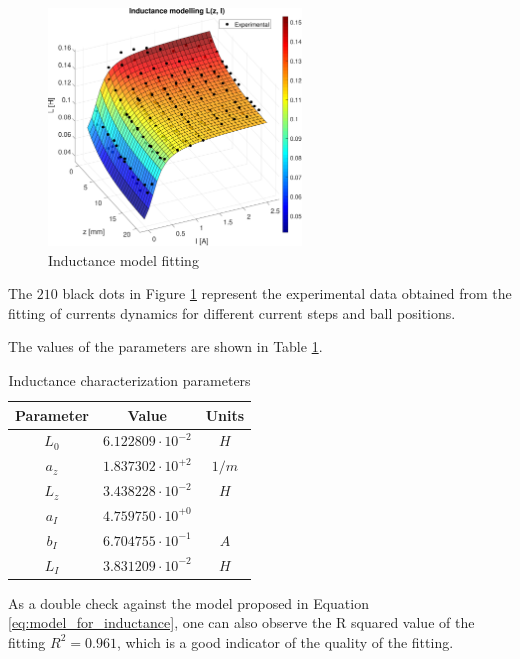\begin{figure}[H]
    \centering
    \includegraphics[width=0.6\textwidth]{img/MATLAB/identification/inductance.pdf}
    \caption{Inductance model fitting}
    \label{fig:inductance_characterization_inductance}
\end{figure}

The $210$ black dots in Figure \ref{fig:inductance_characterization_inductance} represent the experimental data obtained from the fitting of currents dynamics for different current steps and ball positions.

The values of the parameters are shown in Table \ref{tab:inductance_characterization_parameters}.

\begin{table}[H]
    \centering
    \begin{tabular}{|c|c|c|}
        \hline
        \textbf{Parameter} & \textbf{Value}           & \textbf{Units} \\
        \hline
        $L_0$              & $6.122809 \cdot 10^{-2}$ & $H$            \\
        $a_z$              & $1.837302 \cdot 10^{+2}$ & $1/m$          \\
        $L_z$              & $3.438228 \cdot 10^{-2}$ & $H$            \\
        $a_I$              & $4.759750 \cdot 10^{+0}$ &                \\
        $b_I$              & $6.704755 \cdot 10^{-1}$ & $A$            \\
        $L_I$              & $3.831209 \cdot 10^{-2}$ & $H$            \\
        \hline
    \end{tabular}

    \caption{Inductance characterization parameters}
    \label{tab:inductance_characterization_parameters}

\end{table}

As a double check against the model proposed in Equation \ref{eq:model_for_inductance}, one can also observe the R squared value of the fitting $R^2 = 0.961$, which is a good indicator of the quality of the fitting.
